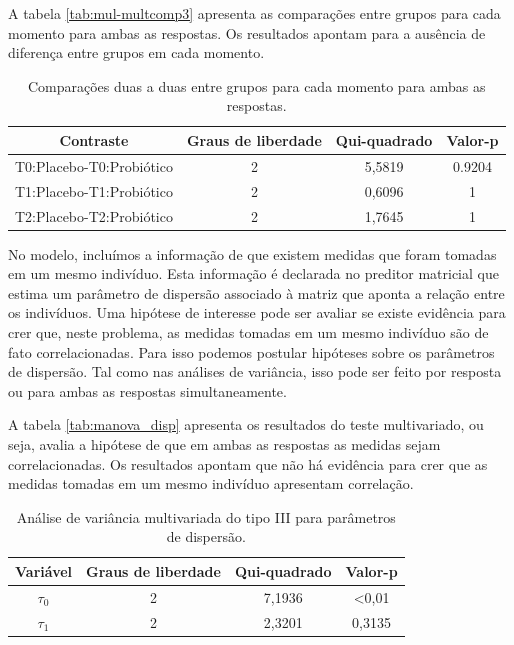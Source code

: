 \documentclass[AMA,STIX1COL]{WileyNJD-v2}
\begin{document}
A tabela \autoref{tab:mul-multcomp3} apresenta as comparações entre grupos para cada momento para ambas as respostas. Os resultados apontam para a ausência de diferença entre grupos em cada momento.

\begin{table}[H]
\centering
\begin{tabular}{cccc}
\hline
Contraste                & Graus de liberdade & Qui-quadrado & Valor-p \\ \hline
T0:Placebo-T0:Probiótico & 2                  & 5,5819       & 0.9204  \\
T1:Placebo-T1:Probiótico & 2                  & 0,6096       & 1       \\
T2:Placebo-T2:Probiótico & 2                  & 1,7645       & 1       \\ \hline
\end{tabular}
\caption{Comparações duas a duas entre grupos para cada momento para ambas as respostas.}
\label{tab:mul-multcomp3}
\end{table}

No modelo, incluímos a informação de que existem medidas que foram tomadas em um mesmo indivíduo. Esta informação é declarada no preditor matricial que estima um parâmetro de dispersão associado à matriz que aponta a relação entre os indivíduos. Uma hipótese de interesse pode ser avaliar se existe evidência para crer que, neste problema, as medidas tomadas em um mesmo indivíduo são de fato correlacionadas. Para isso podemos postular hipóteses sobre os parâmetros de dispersão. Tal como nas análises de variância, isso pode ser feito por resposta ou para ambas as respostas simultaneamente.

A tabela \autoref{tab:manova_disp} apresenta os resultados do teste multivariado, ou seja, avalia a hipótese de que em ambas as respostas as medidas sejam correlacionadas. Os resultados apontam que não há evidência para crer que as medidas tomadas em um mesmo indivíduo apresentam correlação.

\begin{table}[H]
\centering
\begin{tabular}{cccc}
\hline
Variável               & Graus de liberdade & Qui-quadrado & Valor-p        \\ \hline
$\tau_0$ & 2                  & 7,1936       & \textless 0,01 \\
$\tau_1$ & 2                  & 2,3201       & 0,3135         \\ \hline
\end{tabular}
\caption{Análise de variância multivariada do tipo III para parâmetros de dispersão.}
\label{tab:manova_disp}
\end{table}
\end{document}
